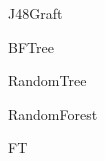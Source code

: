 \documentclass[
	handout,
  	aspectratio=169
]{beamer}
\begin{document}
		\begin{frame}{J48Graft}		
		\end{frame}

		\begin{frame}{BFTree}		
		\end{frame}

		\begin{frame}{RandomTree}		
		\end{frame}

		\begin{frame}{RandomForest}		
		\end{frame}

		\begin{frame}{FT}		
		\end{frame}
\end{document}
